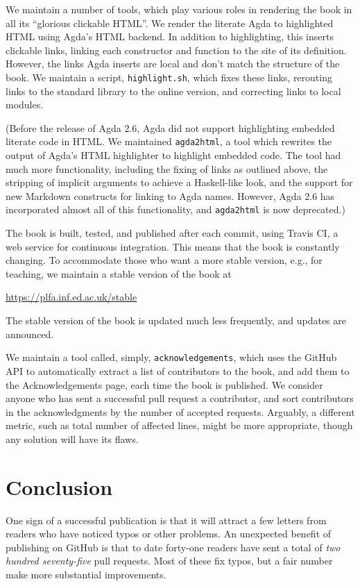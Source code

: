 \documentclass[preprint,authoryear]{elsarticle}
\begin{document}
We maintain a number of tools, which play various roles in rendering the book in
all its ``glorious clickable HTML''. We render the literate Agda to highlighted
HTML using Agda's HTML backend. In addition to highlighting, this inserts
clickable links, linking each constructor and function to the site of its
definition.  However, the links Agda inserts are local and don't match the
structure of the book.  We maintain a script, \texttt{highlight.sh}, which fixes
these links, rerouting links to the standard library to the online version, and
correcting links to local modules.

(Before the release of Agda 2.6, Agda did not support highlighting embedded
literate code in HTML.  We maintained \texttt{agda2html}, a tool which rewrites
the output of Agda's HTML highlighter to highlight embedded code. The tool had
much more functionality, including the fixing of links as outlined above, the
stripping of implicit arguments to achieve a Haskell-like look, and the support
for new Markdown constructs for linking to Agda names. However, Agda 2.6 has
incorporated almost all of this functionality, and \texttt{agda2html} is now
deprecated.)

The book is built, tested, and published after each commit, using Travis CI, a
web service for continuous integration.  This means that the book is constantly
changing.  To accommodate those who want a more stable version, e.g., for
teaching, we maintain a stable version of the book at
\begin{center}
  \url{https://plfa.inf.ed.ac.uk/stable}
\end{center}
The stable version of the book is updated much less frequently, and updates
are announced.

We maintain a tool called, simply, \texttt{acknowledgements}, which uses
the GitHub API to automatically extract a list of contributors to the book, and
add them to the Acknowledgements page, each time the book is published.  We
consider anyone who has sent a successful pull request a contributor, and sort
contributors in the acknowledgments by the number of accepted requests.
Arguably, a different metric, such as total number of affected lines, might be
more appropriate, though any solution will have its flaws.

\section{Conclusion}

One sign of a successful publication is that it will attract a few letters from
readers who have noticed typos or other problems.  An unexpected benefit of
publishing on GitHub is that to date forty-one readers have sent a total of
\emph{two hundred seventy-five} pull requests.  Most of these fix typos, but a
fair number make more substantial improvements.
\end{document}
